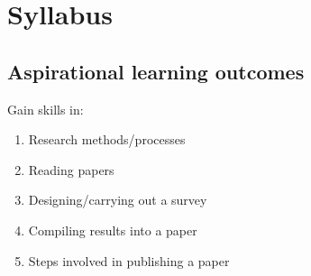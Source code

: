 \documentclass[12pt, twocolumn]{article}
\begin{document}
%
%
%
%
%
%


\newpage
\section{Syllabus}
\subsection{Aspirational learning outcomes}
Gain skills in:
\begin{enumerate}
	\item Research methods/processes
	\item Reading papers
	\item Designing/carrying out a survey
	\item Compiling results into a paper
	\item Steps involved in publishing a paper
\end{enumerate}
\end{document}
